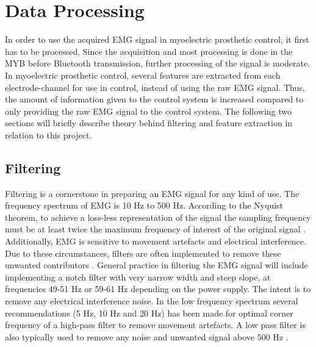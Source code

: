 \section{Data Processing} \label{sec:BG:dataProcessing}


In order to use the acquired EMG signal in myoelectric prosthetic control, it first has to be processed. %
Since the acquisition and most processing is done in the MYB before Bluetooth transmission, further processing of the signal is moderate. In myoelectric prosthetic control, several features are extracted from each electrode-channel for use in control, instead of using the raw EMG signal. Thus, the amount of information given to the control system is increased compared to only providing the raw EMG signal to the control system. The following two sections will briefly describe theory behind filtering and feature extraction in relation to this project. 


\subsection{Filtering} \label{sub:BG:filtering} %

Filtering is a cornerstone in preparing an EMG signal for any kind of use. The frequency spectrum of EMG is 10 Hz to 500 Hz. \cite{Cram2012} According to the Nyquist theorem, to achieve a loss-less representation of the signal the sampling frequency must be at least twice the maximum frequency of interest of the original signal \cite{Pozzo2004}. Additionally, EMG is sensitive to movement artefacts and electrical interference. Due to these circumstances, filters are often implemented to remove these unwanted contributors \cite{DeLuca2010}. 
General practice in filtering the EMG signal will include implementing a notch filter with very narrow width and steep slope, at frequencies 49-51 Hz or 59-61 Hz depending on the power supply. The intent is to remove any electrical interference noise. In the low frequency spectrum several recommendations (5 Hz, 10 Hz and 20 Hz) has been made for optimal corner frequency of a high-pass filter to remove movement artefacts. A low pass filter is also typically used to remove any noise and unwanted signal above 500 Hz \cite{Cram2012}. 

